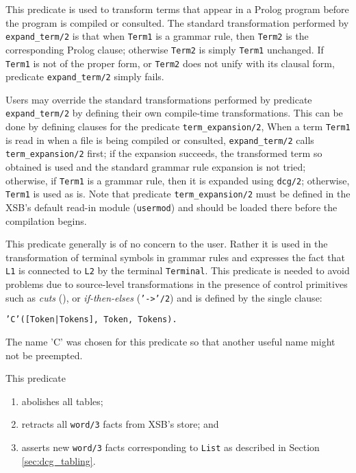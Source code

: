 \begin{description}
    This predicate is used to transform terms that appear in a Prolog program
    before the program is compiled or consulted.
    The standard transformation performed by {\tt expand\_term/2} is that 
    when {\tt Term1} is a grammar rule, then {\tt Term2} is the corresponding
    Prolog clause; otherwise {\tt Term2} is simply {\tt Term1} unchanged. If
    {\tt Term1} is not of the proper form, or {\tt Term2} does not unify with
    its clausal form, predicate {\tt expand\_term/2} simply fails.

    Users may override the standard transformations performed by
    predicate {\tt expand\_term/2} by defining their own compile-time
    transformations.  This can be done by defining clauses for the
    predicate {\tt term\_expansion/2},
    When a term {\tt Term1} is read in when a file is being compiled
    or consulted, {\tt expand\_term/2} calls {\tt term\_expansion/2}
    first; if the expansion succeeds, the transformed term so obtained
    is used and the standard grammar rule expansion is not tried;
    otherwise, if {\tt Term1} is a grammar rule, then it is expanded
    using {\tt dcg/2}; otherwise, {\tt Term1} is used as is.  Note
    that predicate {\tt term\_expansion/2} must be defined in the
    XSB's default read-in module ({\tt usermod}) and should be loaded
    there before the compilation begins.

This predicate generally is of no concern to the user.  Rather it is used 
    in the transformation of terminal symbols in 
    grammar rules and expresses the fact that {\tt L1} is connected 
    to {\tt L2} by the terminal {\tt Terminal}. This predicate is
    needed to avoid problems due to source-level
    transformations in the presence of control primitives such as
    {\em cuts} (\cut), or {\em if-then-elses} 
    ({\tt '->'/2}) and is defined by the single clause:
    \begin{center}
                {\tt 'C'([Token|Tokens], Token, Tokens).}
    \end{center}
    The name 'C' was chosen for this predicate so that another useful
    name might not be preempted.

This predicate 

\begin{enumerate}
\item abolishes all tables;
\item retracts all {\tt word/3} facts from XSB's store; and
\item asserts new {\tt word/3} facts corresponding to {\tt List} as
described in Section \ref{sec:dcg_tabling}.
\end{enumerate}


\end{description}
